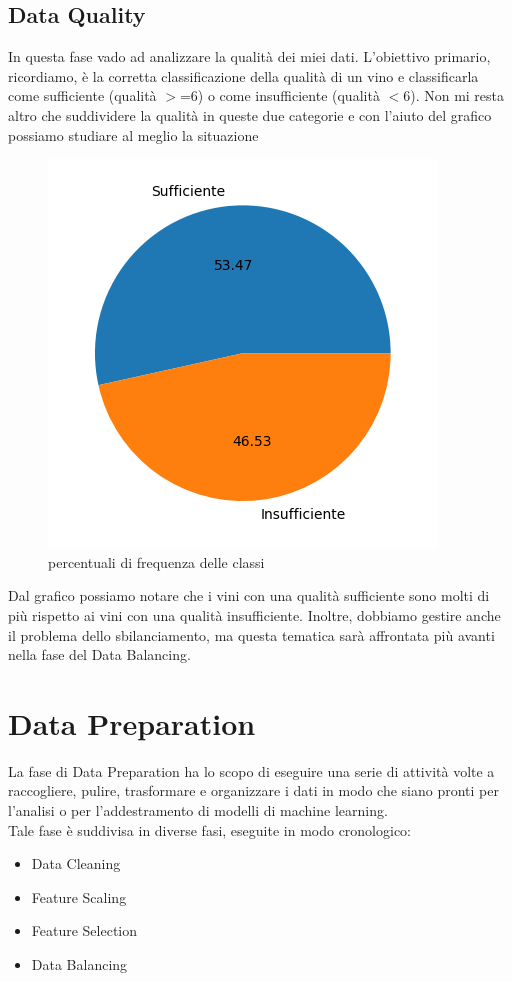 \documentclass{article}
\begin{document}
\begin{titlepage}
        \newpage
        \subsection{Data Quality}
        In questa fase vado ad analizzare la qualità dei miei dati.
        L'obiettivo primario, ricordiamo, è la corretta classificazione della qualità di un vino e classificarla come sufficiente (qualità \( >\)=6) o come insufficiente (qualità \( <\)6). Non mi resta altro che suddividere la qualità in queste due categorie e con l'aiuto del grafico possiamo studiare al meglio la situazione

        \begin{figure}[ht]
            \centering
            \includegraphics[width=0.5\linewidth]{pie-quality.png}
            \caption{  percentuali di frequenza delle classi}
            \label{fig:enter-label}
        \end{figure}

        Dal grafico possiamo notare che i vini con una qualità sufficiente sono molti di più rispetto ai vini con una qualità insufficiente.        
        Inoltre, dobbiamo gestire anche il problema dello sbilanciamento, ma questa tematica sarà affrontata più avanti nella fase del Data Balancing.

        \section{Data Preparation}
        La fase di Data Preparation ha lo scopo di eseguire una serie di attività volte a raccogliere, pulire, trasformare e organizzare i dati in modo che siano pronti per l'analisi o per l'addestramento di modelli di machine learning.\\
        Tale fase è suddivisa in diverse fasi, eseguite in modo cronologico:
        \begin{itemize}
            \item Data Cleaning
            \item Feature Scaling
            \item Feature Selection
            \item Data Balancing
        \end{itemize}


\end{titlepage}
\end{document}
